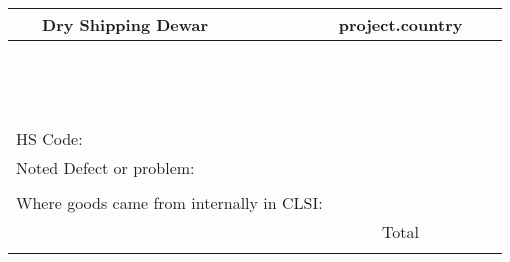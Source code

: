 {\begin{center}
\begin{tabular}{|l|l|c|c|l|l|c|c|l|c|c|c|}
{{{{{{{{\multicolumn{1}{|c|}{} & \multicolumn{8}{l|}{ Dry Shipping Dewar } & \multicolumn{1}{c|}{ {{ project.country }}} & \multicolumn{2}{c|}{} \\ \hline
\multicolumn{1}{|c|}{} & \multicolumn{8}{l|}{} & \multicolumn{1}{c|}{} & \multicolumn{2}{c|}{} \\ \hline
\multicolumn{1}{|c|}{} & \multicolumn{8}{l|}{} & \multicolumn{1}{c|}{} & \multicolumn{2}{c|}{} \\ \hline
\multicolumn{1}{|c|}{} & \multicolumn{8}{l|}{} & \multicolumn{1}{c|}{} & \multicolumn{2}{c|}{} \\ \hline
\multicolumn{1}{|c|}{} & \multicolumn{8}{l|}{} & \multicolumn{1}{c|}{} & \multicolumn{2}{c|}{} \\ \hline
\multicolumn{1}{|c|}{} & \multicolumn{8}{l|}{} & \multicolumn{1}{c|}{} & \multicolumn{2}{c|}{} \\ \hline
\multicolumn{1}{|c|}{} & \multicolumn{8}{l|}{} & \multicolumn{1}{c|}{} & \multicolumn{2}{c|}{} \\ \hline
\multicolumn{1}{|c|}{} & \multicolumn{8}{l|}{} & \multicolumn{1}{c|}{} & \multicolumn{2}{c|}{} \\ \hline
\multicolumn{1}{|c|}{} & \multicolumn{8}{l|}{} & \multicolumn{1}{c|}{} & \multicolumn{2}{c|}{} \\ \hline
\multicolumn{1}{|c|}{} & \multicolumn{8}{l|}{} & \multicolumn{1}{c|}{} & \multicolumn{2}{c|}{} \\ \hline
\multicolumn{1}{|c|}{} & \multicolumn{8}{l|}{} & \multicolumn{1}{c|}{} & \multicolumn{2}{c|}{} \\ \hline
\multicolumn{1}{|c|}{} & \multicolumn{8}{l|}{} & \multicolumn{1}{c|}{} & \multicolumn{2}{c|}{} \\ \hline
\multicolumn{1}{|c|}{} & \multicolumn{8}{l|}{} & \multicolumn{1}{c|}{} & \multicolumn{2}{c|}{} \\ \hline
\multicolumn{1}{|c|}{} & \multicolumn{8}{l|}{} & \multicolumn{1}{c|}{} & \multicolumn{2}{c|}{} \\ \hline
\multicolumn{1}{|c|}{} & \multicolumn{8}{l|}{} & \multicolumn{1}{c|}{} & \multicolumn{2}{c|}{} \\ \hline

\multicolumn{9}{|l|}{ HS Code: } & \multicolumn{1}{c|}{} & \multicolumn{2}{c|}{} \\ \hline
\multicolumn{9}{|l|}{ Noted Defect or problem: } & \multicolumn{1}{c|}{} & \multicolumn{2}{c|}{} \\ \cline{10-12}
\multicolumn{9}{|l|}{} & \multicolumn{1}{c|}{} & \multicolumn{2}{c|}{} \\ \hline
\multicolumn{9}{|l|}{ Where goods came from internally in CLSI: } & \multicolumn{1}{c|}{} & \multicolumn{2}{c|}{} \\ \cline{10-12}
\multicolumn{9}{|l|}{} & \multicolumn{1}{c|}{ Total } & \multicolumn{2}{c|}{} \\ \hline

}}}}}}}}
\end{tabular}
\end{center}}
